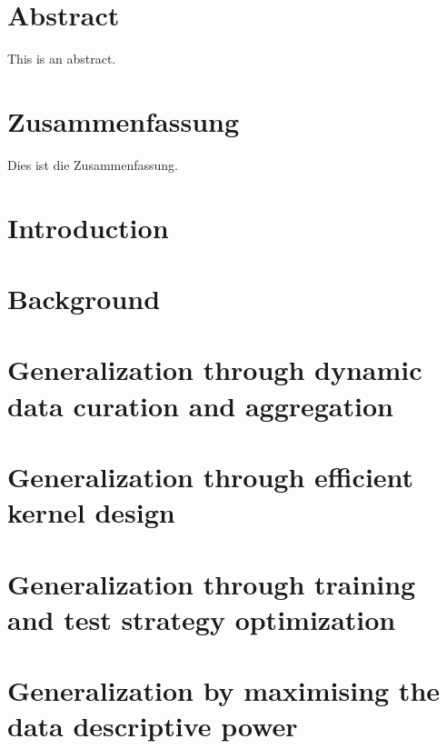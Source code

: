 \documentclass[11pt, a4paper, oneside, headsepline, titlepage, DIV=11, BCOR=12mm, captions=tableheading, chapterprefix=on, numbers=noenddot]{scrbook}
\begin{document}
    \thispagestyle{headings}
    

    \enlargethispage{1\baselineskip}
    \setcounter{page}{1}

    \chapter*{Abstract} %
        This is an abstract.
    \cleardoublepage

    \chapter*{Zusammenfassung} %
        Dies ist die Zusammenfassung.
    \cleardoublepage

    \tableofcontents
    \cleardoublepage

    \chapter{Introduction} %
        

    \chapter{Background} %
        

    \chapter{Generalization through dynamic data curation and aggregation}
        

    \chapter{Generalization through efficient kernel design}
        

    \chapter{Generalization through training and test strategy optimization}
        

    \chapter{Generalization by maximising the data descriptive power}
        
\end{document}
